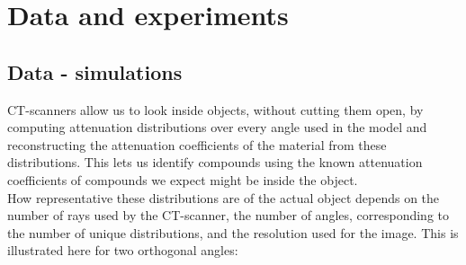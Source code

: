 \documentclass{article}
\begin{document}
\section{Data and experiments}
\vspace*{-0.3\baselineskip}
\subsection{Data - simulations}
CT-scanners allow us to look inside objects, without cutting them open, by computing attenuation distributions over every angle used in the model and reconstructing the attenuation coefficients of the material from these distributions. This lets us identify compounds using the known attenuation coefficients of compounds we expect might be inside the object. \\ 
How representative these distributions are of the actual object depends on the number of rays used by the CT-scanner, the number of angles, corresponding to the number of unique distributions, and the resolution used for the image. This is illustrated here for two orthogonal angles:
\end{document}
